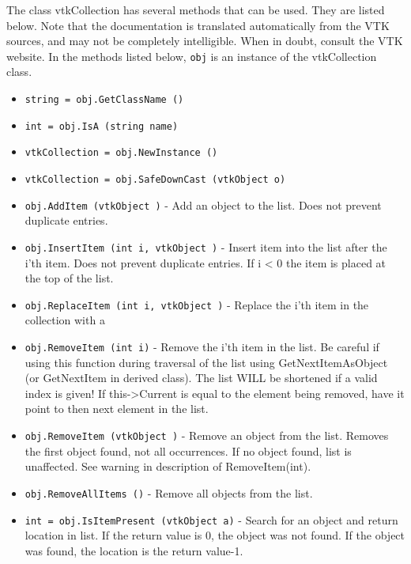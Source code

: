 The class vtkCollection has several methods that can be used.
  They are listed below.
Note that the documentation is translated automatically from the VTK sources,
and may not be completely intelligible.  When in doubt, consult the VTK website.
In the methods listed below, \verb|obj| is an instance of the vtkCollection class.
\begin{itemize}
\item  \verb|string = obj.GetClassName ()|

\item  \verb|int = obj.IsA (string name)|

\item  \verb|vtkCollection = obj.NewInstance ()|

\item  \verb|vtkCollection = obj.SafeDownCast (vtkObject o)|

\item  \verb|obj.AddItem (vtkObject )| -  Add an object to the list. Does not prevent duplicate entries.

\item  \verb|obj.InsertItem (int i, vtkObject )| -  Insert item into the list after the i'th item. Does not prevent duplicate entries.
 If i < 0 the item is placed at the top of the list.

\item  \verb|obj.ReplaceItem (int i, vtkObject )| -  Replace the i'th item in the collection with a

\item  \verb|obj.RemoveItem (int i)| -  Remove the i'th item in the list.
 Be careful if using this function during traversal of the list using 
 GetNextItemAsObject (or GetNextItem in derived class).  The list WILL
 be shortened if a valid index is given!  If this->Current is equal to the
 element being removed, have it point to then next element in the list.

\item  \verb|obj.RemoveItem (vtkObject )| -  Remove an object from the list. Removes the first object found, not
 all occurrences. If no object found, list is unaffected.  See warning
 in description of RemoveItem(int).

\item  \verb|obj.RemoveAllItems ()| -  Remove all objects from the list.

\item  \verb|int = obj.IsItemPresent (vtkObject a)| -  Search for an object and return location in list. If the return value is
 0, the object was not found. If the object was found, the location is
 the return value-1.


\end{itemize}

